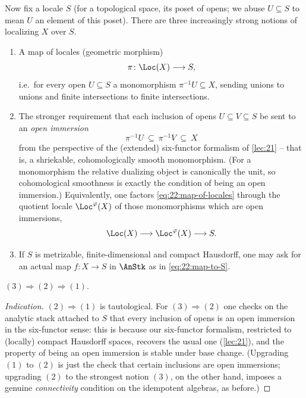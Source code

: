 Now fix a locale $S$ (for a topological space, its poset of opens; we abuse
$U\subseteq S$ to mean $U$ an element of this poset). There are three
increasingly strong notions of localizing $X$ over $S$.
\begin{enumerate}
\item A map of locales (geometric morphism)
\begin{equation}
\label{eq:22:map-of-locales}
\pi\colon \Loc(X)\longrightarrow S ,
\end{equation}
i.e.\ for every open $U\subseteq S$ a monomorphism $\pi^{-1}U\subseteq X$,
sending unions to unions and finite intersections to finite intersections.
\item The stronger requirement that each inclusion of opens $U\subseteq V
\subseteq S$ be sent to an \emph{open immersion}
\begin{equation*}
\pi^{-1}U\ \subseteq\ \pi^{-1}V\ \subseteq\ X
\end{equation*}
from the perspective of the (extended) six-functor formalism of \cref{lec:21}
-- that is, a shriekable, cohomologically smooth monomorphism. (For a
monomorphism the relative dualizing object is canonically the unit, so
cohomological smoothness is exactly the condition of being an open immersion.)
Equivalently, one factors \eqref{eq:22:map-of-locales} through the quotient
locale $\Loc^{\varphi}(X)$ of those monomorphisms which are open immersions,
\begin{equation}
\label{eq:22:factor-through-phi}
\Loc(X)\longrightarrow \Loc^{\varphi}(X)\longrightarrow S .
\end{equation}
\item If $S$ is metrizable, finite-dimensional and compact Hausdorff, one may
ask for an actual map $f\colon X\to S$ in $\AnStk$ as in
\eqref{eq:22:map-to-S}.
\end{enumerate}

\begin{proposition}
\label{prop:22:implications}
$(3)\Rightarrow(2)\Rightarrow(1)$.
\end{proposition}

\begin{proof}[Indication]
$(2)\Rightarrow(1)$ is tautological. For $(3)\Rightarrow(2)$ one checks on the
analytic stack attached to $S$ that every inclusion of opens is an open
immersion in the six-functor sense: this is because our six-functor formalism,
restricted to (locally) compact Hausdorff spaces, recovers the usual one
(\cref{lec:21}), and the property of being an open immersion is stable under
base change. (Upgrading $(1)$ to $(2)$ is just the check that certain inclusions
are open immersions; upgrading $(2)$ to the strongest notion $(3)$, on the other
hand, imposes a genuine \emph{connectivity} condition on the idempotent algebras,
as before.)
\end{proof}

